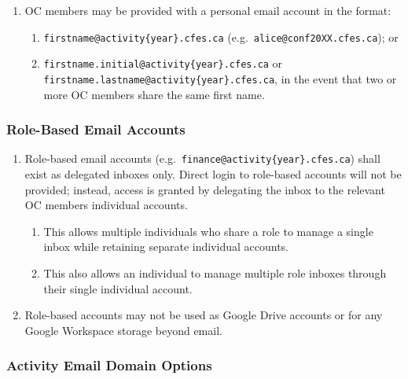 \begin{enumerate}
 \item
  OC members may be provided with a personal email account in the format:
  \begin{enumerate}
   \item
    \texttt{firstname@activity\{year\}.cfes.ca} (e.g.\ \texttt{alice@conf20XX.cfes.ca}); or
   \item
    \texttt{firstname.initial@activity\{year\}.cfes.ca} or \texttt{firstname.lastname@activity\{year\}.cfes.ca}, in the event that two or more OC members share the same first name.
  \end{enumerate}
\end{enumerate}

\subsubsection{Role-Based Email Accounts}
\label{role-based-email-accounts}

\begin{enumerate}
 \item
  Role-based email accounts (e.g.\ \texttt{finance@activity\{year\}.cfes.ca}) shall exist as delegated inboxes only. Direct login to role-based accounts will not be provided; instead, access is granted by delegating the inbox to the relevant OC members\textquotesingle{} individual accounts.

  \begin{enumerate}
   \item
    This allows multiple individuals who share a role to manage a single inbox while retaining separate individual accounts.
   \item
    This also allows an individual to manage multiple role inboxes through their single individual account.
  \end{enumerate}

 \item
  Role-based accounts may not be used as Google Drive accounts or for any Google Workspace storage beyond email.
\end{enumerate}

\subsubsection{Activity Email Domain Options}
\label{activity-email-domain-options}

